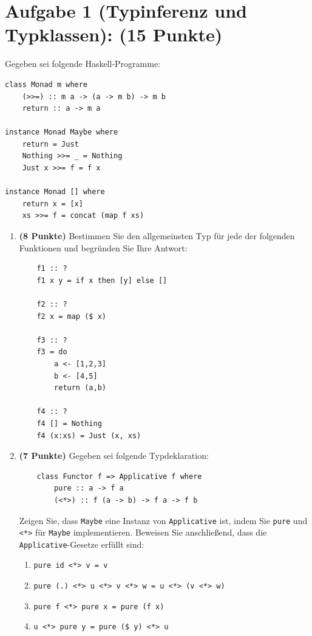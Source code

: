 \documentclass[12pt,a4paper]{article}
\makeatletter
\def\cleardoublepage{\clearpage\if@twoside\ifodd\c@page\else%
\hbox{}%
\thispagestyle{empty}%
\newpage%
\if@twocolumn\hbox{}\newpage\fi\fi\fi}
\makeatother
\begin{document}
\cleardoublepage

\section*{Aufgabe 1 (Typinferenz und Typklassen): (15 Punkte)}

Gegeben sei folgende Haskell-Programme:

\begin{verbatim}
class Monad m where
    (>>=) :: m a -> (a -> m b) -> m b
    return :: a -> m a

instance Monad Maybe where
    return = Just
    Nothing >>= _ = Nothing
    Just x >>= f = f x

instance Monad [] where
    return x = [x]
    xs >>= f = concat (map f xs)
\end{verbatim}

\begin{enumerate}
    \item \textbf{(8 Punkte)} Bestimmen Sie den allgemeinsten Typ für jede der folgenden Funktionen und begründen Sie Ihre Antwort:
    
    \begin{verbatim}
    f1 :: ?
    f1 x y = if x then [y] else []

    f2 :: ?
    f2 x = map ($ x)

    f3 :: ?
    f3 = do
        a <- [1,2,3]
        b <- [4,5]
        return (a,b)

    f4 :: ?
    f4 [] = Nothing
    f4 (x:xs) = Just (x, xs)
    \end{verbatim}

    \item \textbf{(7 Punkte)} Gegeben sei folgende Typdeklaration:
    \begin{verbatim}
    class Functor f => Applicative f where
        pure :: a -> f a
        (<*>) :: f (a -> b) -> f a -> f b
    \end{verbatim}
    
    Zeigen Sie, dass \texttt{Maybe} eine Instanz von \texttt{Applicative} ist, indem Sie \texttt{pure} und \texttt{<*>} für \texttt{Maybe} implementieren. Beweisen Sie anschließend, dass die \texttt{Applicative}-Gesetze erfüllt sind:
    \begin{enumerate}
        \item \texttt{pure id <*> v = v}
        \item \texttt{pure (.) <*> u <*> v <*> w = u <*> (v <*> w)}
        \item \texttt{pure f <*> pure x = pure (f x)}
        \item \texttt{u <*> pure y = pure (\$ y) <*> u}
    \end{enumerate}
\end{enumerate}
\end{document}
